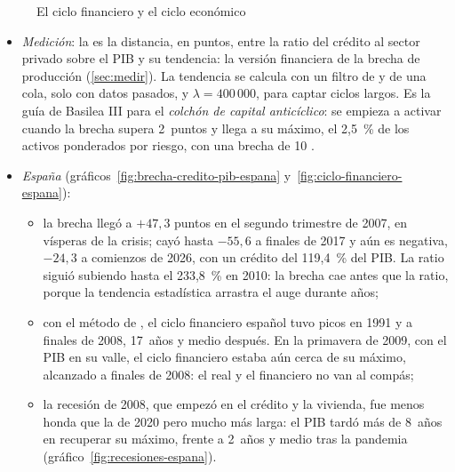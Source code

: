 \documentclass[11pt]{article}
\begin{document}
\begin{figure}[H]
\centering
\caption{El ciclo financiero y el ciclo económico}\label{fig:ciclo-financiero-esquema}
\end{figure}

\begin{itemize}
\item \emph{Medición}: la  es la distancia, en puntos, entre la ratio del crédito al sector privado sobre el PIB y su tendencia: la versión financiera de la brecha de producción (\ref{sec:medir}). La tendencia se calcula con un filtro de  y  de una cola, solo con datos pasados, y $\lambda=400\,000$, para captar ciclos largos. Es la guía de Basilea III para el \emph{colchón de capital anticíclico}: se empieza a activar cuando la brecha supera 2~puntos y llega a su máximo, el 2,5~\% de los activos ponderados por riesgo, con una brecha de 10\nocite{BCBS2010Anticiclico} .
\item \emph{España} (gráficos~\ref{fig:brecha-credito-pib-espana} y~\ref{fig:ciclo-financiero-espana}):
  \begin{itemize}
  \item la brecha llegó a $+47{,}3$ puntos en el segundo trimestre de 2007, en vísperas de la crisis; cayó hasta $-55{,}6$ a finales de 2017 y aún es negativa, $-24{,}3$ a comienzos de 2026, con un crédito del 119,4~\% del PIB. La ratio siguió subiendo hasta el 233,8~\% en 2010: la brecha cae antes que la ratio, porque la tendencia estadística arrastra el auge durante años\nocite{BIS2026CreditGap};
  \item con el método de \textcite{DrehmannBorioTsatsaronis2012}, el ciclo financiero español tuvo picos en 1991 y a finales de 2008, 17~años y medio después. En la primavera de 2009, con el PIB en su valle, el ciclo financiero estaba aún cerca de su máximo, alcanzado a finales de 2008: el real y el financiero no van al compás\nocite{BIS2026TotalCreditES,BIS2026PreciosViviendaES};
  \item la recesión de 2008, que empezó en el crédito y la vivienda, fue menos honda que la de 2020 pero mucho más larga: el PIB tardó más de 8~años en recuperar su máximo, frente a 2~años y medio tras la pandemia (gráfico~\ref{fig:recesiones-espana})\nocite{INE2026CNTRVolumen}.
  \end{itemize}
\end{itemize}
\end{document}
